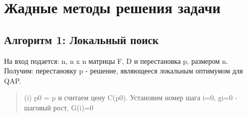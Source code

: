 \section{Жадные методы решения задачи}

\subsection{Алгоритм 1: Локальный поиск}
На вход подается: n, n x n матрицы F, D и перестановка p, размером n.
Получим: перестановку p - решение, являющееся локальным оптимумом для QAP.
\begin{quotation}
    (i) p0 = p и считаем цену C(p0). Установим номер шага i=0, gi=0 - шаговый рост, G(i)=0
\end{quotation}

\newpage